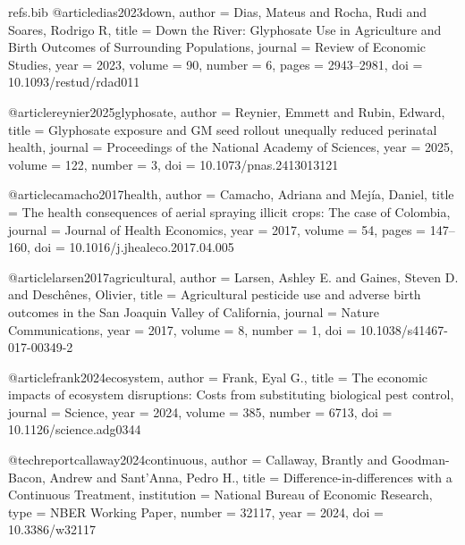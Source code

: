 \begin{filecontents*}[overwrite]{refs.bib}
@article{dias2023down,
  author  = {Dias, Mateus and Rocha, Rudi and Soares, Rodrigo R},
  title   = {Down the River: Glyphosate Use in Agriculture and Birth Outcomes of Surrounding Populations},
  journal = {Review of Economic Studies},
  year    = {2023},
  volume  = {90},
  number  = {6},
  pages   = {2943--2981},
  doi     = {10.1093/restud/rdad011}
}

@article{reynier2025glyphosate,
  author  = {Reynier, Emmett and Rubin, Edward},
  title   = {Glyphosate exposure and {GM} seed rollout unequally reduced perinatal health},
  journal = {Proceedings of the National Academy of Sciences},
  year    = {2025},
  volume  = {122},
  number  = {3},
  doi     = {10.1073/pnas.2413013121}
}

@article{camacho2017health,
  author  = {Camacho, Adriana and Mejía, Daniel},
  title   = {The health consequences of aerial spraying illicit crops: The case of Colombia},
  journal = {Journal of Health Economics},
  year    = {2017},
  volume  = {54},
  pages   = {147--160},
  doi     = {10.1016/j.jhealeco.2017.04.005}
}

@article{larsen2017agricultural,
  author  = {Larsen, Ashley E. and Gaines, Steven D. and Deschênes, Olivier},
  title   = {Agricultural pesticide use and adverse birth outcomes in the {San Joaquin Valley} of {California}},
  journal = {Nature Communications},
  year    = {2017},
  volume  = {8},
  number  = {1},
  doi     = {10.1038/s41467-017-00349-2}
}

@article{frank2024ecosystem,
  author  = {Frank, Eyal G.},
  title   = {The economic impacts of ecosystem disruptions: Costs from substituting biological pest control},
  journal = {Science},
  year    = {2024},
  volume  = {385},
  number  = {6713},
  doi     = {10.1126/science.adg0344}
}

@techreport{callaway2024continuous,
  author  = {Callaway, Brantly and Goodman-Bacon, Andrew and Sant'Anna, Pedro H.},
  title   = {Difference-in-differences with a Continuous Treatment},
  institution = {National Bureau of Economic Research},
  type    = {NBER Working Paper},
  number  = {32117},
  year    = {2024},
  doi     = {10.3386/w32117}
}


\end{filecontents*}
